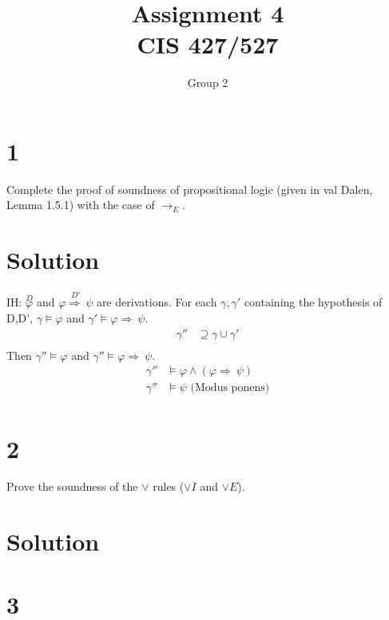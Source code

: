 \documentclass[10pt]{article}
\renewcommand{\implies}{\Rightarrow \ }
\begin{document}
\title{Assignment \raisebox{.22ex}{\large\#}4 \\
	CIS 427/527}
\author{Group 2}

\maketitle

\section*{1}

Complete the proof of soundness of propositional logic (given in val Dalen, Lemma 1.5.1) with the case of $\to _E$.

\section*{Solution}
IH: $\overset{D}{\varphi}$ and $\overset{D'}{\varphi \implies \psi}$ are derivations. For each $\gamma , \gamma'$ containing the hypothesis of D,D', $\gamma \models \varphi$ and $\gamma' \models \varphi \implies \psi$.
\begin{align*}
\gamma'' &\supseteq \gamma \cup \gamma' \\
\end{align*}
Then $\gamma'' \models \varphi$ and $\gamma'' \models \varphi \implies \psi$.
\begin{align*}
\gamma'' &\models \varphi \land (\varphi \implies \psi) \\ 
\gamma'' &\models \psi \text{ (Modus ponens)} \\
\end{align*}
\section*{2}

Prove the soundness of the $\lor$ rules ($\lor I$ and $\lor E$).

\section*{Solution}

\section*{3}
\end{document}
